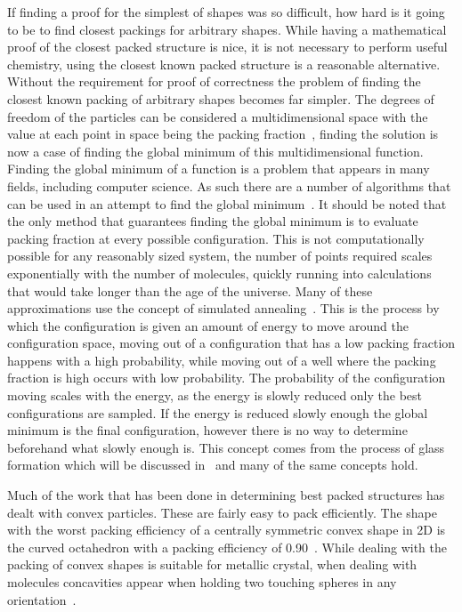 If finding a proof for the simplest of shapes was so difficult, how hard is it going to be to find closest packings for arbitrary shapes. While having a mathematical proof of the closest packed structure is nice, it is not necessary to perform useful chemistry, using the closest known packed structure is a reasonable alternative. Without the requirement for proof of correctness the problem of finding the closest known packing of arbitrary shapes becomes far simpler. The degrees of freedom of the particles can be considered a multidimensional space with the value at each point in space being the packing fraction~, finding the solution is now a case of finding the global minimum of this multidimensional function. Finding the global minimum of a function is a problem that appears in many fields, including computer science. As such there are a number of algorithms that can be used in an attempt to find the global minimum~\tocite. It should be noted that the only method that guarantees finding the global minimum is to evaluate packing fraction at every possible configuration. This is not computationally possible for any reasonably sized system, the number of points required scales exponentially with the number of molecules, quickly running into calculations that would take longer than the age of the universe. Many of these approximations use the concept of simulated annealing~\tocite. This is the process by which the configuration is given an amount of energy to move around the configuration space, moving out of a configuration that has a low packing fraction happens with a high probability, while moving out of a well where the packing fraction is high occurs with low probability. The probability of the configuration moving scales with the energy, as the energy is slowly reduced only the best configurations are sampled. If the energy is reduced slowly enough the global minimum is the final configuration, however there is no way to determine beforehand what slowly enough is. This concept comes from the process of glass formation which will be discussed in~ and many of the same concepts hold.

\begin{figure}
    \caption{}
    \label{fig:packing space}
\end{figure}

Much of the work that has been done in determining best packed structures has dealt with convex particles. These are fairly easy to pack efficiently. The shape with the worst packing efficiency of a centrally symmetric convex shape in 2D is the curved octahedron with a packing efficiency of 0.90~\tocite. While dealing with the packing of convex shapes is suitable for metallic crystal, when dealing with molecules concavities appear when holding two touching spheres in any orientation~.

